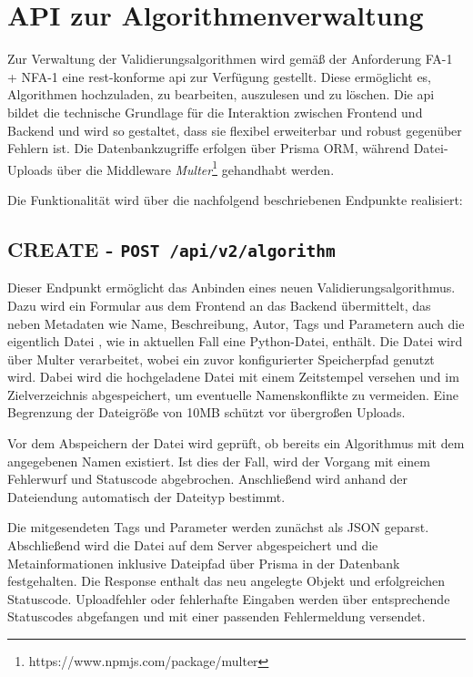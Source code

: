\section{API zur Algorithmenverwaltung}

Zur Verwaltung der Validierungsalgorithmen wird gemäß der Anforderung FA-1 + NFA-1 eine \gls{rest}-konforme \gls{api} zur Verfügung gestellt. Diese ermöglicht es, Algorithmen hochzuladen, zu bearbeiten, auszulesen und zu löschen. Die \gls{api} bildet die technische Grundlage für die Interaktion zwischen Frontend und Backend und wird so gestaltet, dass sie flexibel erweiterbar und robust gegenüber Fehlern ist. Die Datenbankzugriffe erfolgen über Prisma ORM, während Datei-Uploads über die Middleware \textit{Multer}\footnote{https://www.npmjs.com/package/multer} gehandhabt werden.

Die Funktionalität wird über die nachfolgend beschriebenen Endpunkte realisiert:

\subsection{CREATE - \texttt{POST /api/v2/algorithm}}

Dieser Endpunkt ermöglicht das Anbinden eines neuen Validierungsalgorithmus. Dazu wird ein Formular aus dem Frontend an das Backend übermittelt, das neben Metadaten wie Name, Beschreibung, Autor, Tags und Parametern auch die eigentlich Datei , wie in aktuellen Fall eine Python-Datei, enthält. Die Datei wird über Multer verarbeitet, wobei ein zuvor konfigurierter Speicherpfad genutzt wird. Dabei wird die hochgeladene Datei mit einem Zeitstempel versehen und im Zielverzeichnis abgespeichert, um eventuelle Namenskonflikte zu vermeiden. Eine Begrenzung der Dateigröße von 10MB schützt vor übergroßen Uploads.

Vor dem Abspeichern der Datei wird geprüft, ob bereits ein Algorithmus mit dem angegebenen Namen existiert. Ist dies der Fall, wird der Vorgang mit einem Fehlerwurf und Statuscode abgebrochen. Anschließend wird anhand der Dateiendung automatisch der Dateityp bestimmt.

Die mitgesendeten Tags und Parameter werden zunächst als JSON geparst. Abschließend wird die Datei auf dem Server abgespeichert und die Metainformationen inklusive Dateipfad über Prisma in der Datenbank festgehalten. Die Response enthalt das neu angelegte Objekt und erfolgreichen Statuscode. Uploadfehler oder fehlerhafte Eingaben werden über entsprechende Statuscodes abgefangen und mit einer passenden Fehlermeldung versendet.

